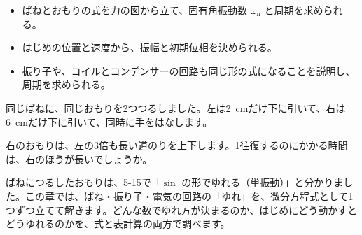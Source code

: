 \begin{goal}
\begin{itemize}[label={\color{\bkTT}●}, leftmargin=1.6\zw, itemsep=0pt, topsep=1pt]
\item {}\enspace ばねとおもりの式を力の図から立て、固有角振動数 $\omega_{\mathrm n}$ と周期を求められる。
\item {}\enspace はじめの位置と速度から、振幅と初期位相を決められる。
\item {}\enspace 振り子や、コイルとコンデンサーの回路も同じ形の式になることを説明し、周期を求められる。
\end{itemize}
\end{goal}

\begin{hatena}
\noindent\begin{minipage}[c]{0.58\linewidth}
\raggedright
同じばねに、同じおもりを2つつるしました。左は\qty{2}{cm}だけ下に引いて、右は\qty{6}{cm}だけ下に引いて、同時に手をはなします。

右のおもりは、左の3倍も長い道のりを上下します。1往復するのにかかる時間は、右のほうが長いでしょうか。
\end{minipage}\hfill
\begin{minipage}[c]{0.39\linewidth}
\centering
{}
\end{minipage}
\end{hatena}

\noindent ばねにつるしたおもりは、5-15で「$\sin$ の形でゆれる（単振動）」と分かりました。この章では、ばね・振り子・電気の回路の「ゆれ」を、微分方程式として1つずつ立てて解きます。どんな数でゆれ方が決まるのか、はじめにどう動かすとどうゆれるのかを、式と表計算の両方で調べます。

